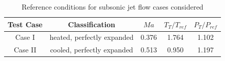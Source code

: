 \begin{table}
\caption{\label{tab:table2} Reference conditions for subsonic jet flow cases considered}
\begin{center}
\begin{tabular}{ccccc}
Test Case & Classification& $Ma$& ${T_T}/{T_{ref}}$& ${P_T}/{P_{ref}}$\\\hline
Case I  & heated, perfectly expanded & 0.376 & 1.764 & 1.102\\
Case II & cooled, perfectly expanded & 0.513 & 0.950 & 1.197\\
\end{tabular}
\end{center}
\end{table}

